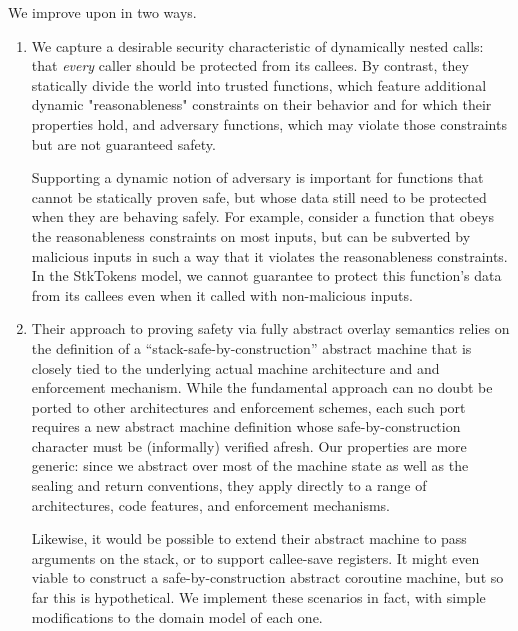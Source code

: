 \documentclass[acmsmall,review,anonymous]{acmart}\settopmatter{printfolios=true,printccs=false,printacmref=false}
\begin{document}
{We improve upon \citet{SkorstengaardSTKJFP} in two ways.

\begin{enumerate}[label=(\roman*)]
\item We capture a desirable security characteristic of dynamically nested
      calls: that {\em every} caller should be protected from its callees.
      By contrast, they statically divide the world into
      trusted functions, which feature additional dynamic "reasonableness"
      constraints on their behavior and for which their properties hold,
      and adversary functions, which may violate those constraints but
      are not guaranteed safety.

      Supporting a dynamic notion of adversary is important for
      functions that cannot be statically proven safe, but whose data
      still need to be protected when they are behaving safely.
      For example, consider a function that obeys the reasonableness
      constraints on most inputs, but can be subverted by malicious inputs
      in such a way that it violates the reasonableness constraints. In
      the StkTokens model, we cannot guarantee to protect this function's
      data from its callees even when it called with non-malicious inputs.

\item Their approach to proving safety via fully abstract overlay
  semantics relies on the definition of a ``stack-safe-by-construction''
  abstract machine that is closely tied to the underlying actual
  machine architecture and and enforcement mechanism.
  While the fundamental approach can no doubt be ported to other architectures and enforcement
  schemes, each such port requires a new abstract machine definition whose
  safe-by-construction character must be (informally) verified afresh.
  Our properties are more generic: since we abstract over most of the machine
  state as well as the sealing and return conventions, they apply directly
  to a range of architectures, code features, and enforcement mechanisms.

  Likewise, it would be possible to extend their abstract machine to pass arguments
  on the stack, or to support callee-save registers. It might even viable to
  construct a safe-by-construction abstract coroutine machine, but so far this is
  hypothetical. We implement these scenarios in fact, with simple modifications to
  the domain model of each one.


\end{enumerate}}
\end{document}
